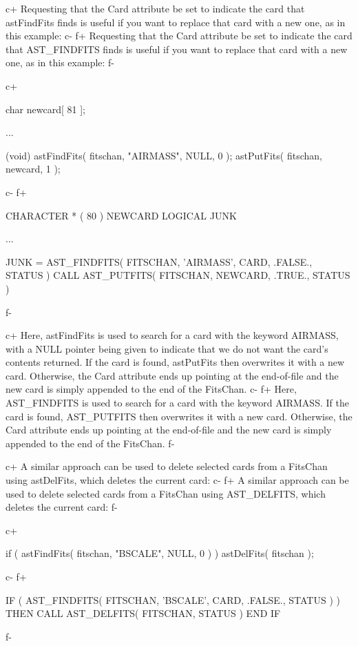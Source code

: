 \documentclass[twoside,11pt]{starlink}
\begin{document}
c+
Requesting that the Card attribute be set to indicate the card that
astFindFits finds is useful if you want to replace that card with a
new one, as in this example:
c-
f+
Requesting that the Card attribute be set to indicate the card that
AST\_FINDFITS finds is useful if you want to replace that card with a
new one, as in this example:
f-

c+
\small
\begin{terminalv}
char newcard[ 81 ];

...

(void) astFindFits( fitschan, "AIRMASS", NULL, 0 );
astPutFits( fitschan, newcard, 1 );
\end{terminalv}
\normalsize
c-
f+
\small
\begin{terminalv}
      CHARACTER * ( 80 ) NEWCARD
      LOGICAL JUNK

      ...

      JUNK = AST_FINDFITS( FITSCHAN, 'AIRMASS', CARD, .FALSE., STATUS )
      CALL AST_PUTFITS( FITSCHAN, NEWCARD, .TRUE., STATUS )
\end{terminalv}
\normalsize
f-

c+
Here, astFindFits is used to search for a card with the keyword
AIRMASS, with a NULL pointer being given to indicate that we do not
want the card's contents returned. If the card is found, astPutFits
then overwrites it with a new card.  Otherwise, the Card attribute
ends up pointing at the end-of-file and the new card is simply
appended to the end of the FitsChan.
c-
f+
Here, AST\_FINDFITS is used to search for a card with the keyword
AIRMASS. If the card is found, AST\_PUTFITS then overwrites it with a
new card.  Otherwise, the Card attribute ends up pointing at the
end-of-file and the new card is simply appended to the end of the
FitsChan.
f-

c+
A similar approach can be used to delete selected cards from a
FitsChan using astDelFits, which deletes the current card:
c-
f+
A similar approach can be used to delete selected cards from a
FitsChan using AST\_DELFITS, which deletes the current card:
f-

c+
\small
\begin{terminalv}
if ( astFindFits( fitschan, "BSCALE", NULL, 0 ) ) astDelFits( fitschan );
\end{terminalv}
\normalsize
c-
f+
\small
\begin{terminalv}
      IF ( AST_FINDFITS( FITSCHAN, 'BSCALE', CARD, .FALSE., STATUS ) ) THEN
         CALL AST_DELFITS( FITSCHAN, STATUS )
      END IF
\end{terminalv}
\normalsize
f-
\end{document}
